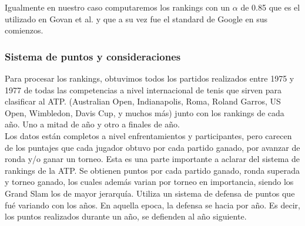 Igualmente en nuestro caso computaremos los rankings con un $\alpha$ de 0.85 que es el utilizado en Govan et al. y que a su vez fue el standard de Google en sus comienzos.	 

\subsubsection{Sistema de puntos y consideraciones}

Para procesar los rankings, obtuvimos todos los partidos realizados entre 1975 y 1977 de todas las competencias a nivel internacional de tenis que sirven para clasificar al ATP. (Australian Open, Indianapolis, Roma, Roland Garros, US Open, Wimbledon, Davis Cup, y muchos más) junto con los rankings de cada año. Uno a mitad de año y otro a finales de año. 
\\
Los datos están completos a nivel enfrentamientos y participantes, pero carecen de los puntajes que cada jugador obtuvo por cada partido ganado, por avanzar de ronda y/o ganar un torneo.
Esta es una parte importante a aclarar del sistema de rankings de la ATP. Se obtienen puntos por cada partido ganado, ronda superada y torneo ganado, los cuales además varian por torneo en importancia, siendo los Grand Slam los de mayor jerarquía. 
Utiliza un sistema de defensa de puntos que fué variando con los años. En aquella epoca, la defensa se hacia por año. Es decir, los puntos realizados durante un año, se defienden al año siguiente. 

